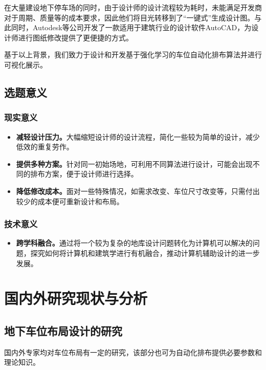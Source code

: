 在大量建设地下停车场的同时，由于设计师的设计流程较为耗时，未能满足开发商对于周期、质量等的成本要求，因此他们将目光转移到了“一键式”生成设计图。与此同时，Autodesk\cite{carrasco2005innovative,JCJG202304039}等公司开发了一款适用于建筑行业的设计软件AutoCAD，为设计师进行图纸修改提供了更便捷的方式。

基于以上背景，我们致力于设计和开发基于强化学习的车位自动化排布算法并进行可视化展示。
\subsection{选题意义}
\subsubsection{现实意义}
\begin{itemize}
    \item {\bfseries 减轻设计压力。}大幅缩短设计师的设计流程，简化一些较为简单的设计，减少低效的重复劳作。
    \item {\bfseries 提供多种方案。}针对同一初始场地，可利用不同算法进行设计，可能会出现不同的排布方案，便于设计师进行选择。
    \item {\bfseries 降低修改成本。}面对一些特殊情况，如需求改变、车位尺寸改变等，只需付出较少的成本便可重新设计和布局。
\end{itemize}
\subsubsection{技术意义}
\begin{itemize}
    \item {\bfseries 跨学科融合。}通过将一个较为复杂的地库设计问题转化为计算机可以解决的问题，探究如何将计算机和建筑学进行有机融合，推动计算机辅助设计的进一步发展。
\end{itemize}
\section{国内外研究现状与分析}
\subsection{地下车位布局设计的研究}
国内外专家均对车位布局有一定的研究，该部分也可为自动化排布提供必要参数和理论知识。


